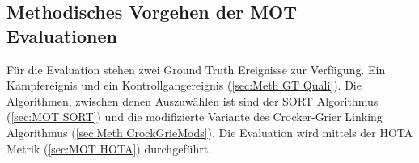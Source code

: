 \subsection{Methodisches Vorgehen der MOT Evaluationen}
Für die Evaluation stehen zwei \gls{Ground Truth} Ereignisse zur Verfügung. Ein Kampfereignis und ein Kontrollgangereignis (\ref{sec:Meth GT Quali}). Die Algorithmen, zwischen denen Auszuwählen ist sind der \acrshort{SORT} Algorithmus (\ref{sec:MOT SORT}) und die modifizierte Variante des Crocker-Grier Linking Algorithmus (\ref{sec:Meth CrockGrieMods}). Die Evaluation wird mittels der \gls{HOTA} Metrik (\ref{sec:MOT HOTA}) durchgeführt. 
